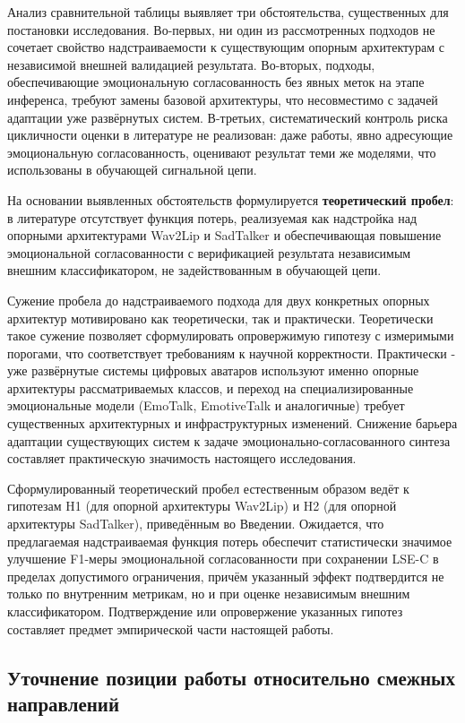 \documentclass[a4paper, 12pt, oneside, openany]{article}
\begin{document}
Анализ сравнительной таблицы выявляет три обстоятельства, существенных для постановки исследования. Во-первых, ни один из рассмотренных подходов не сочетает свойство надстраиваемости к существующим опорным архитектурам с независимой внешней валидацией результата. Во-вторых, подходы, обеспечивающие эмоциональную согласованность без явных меток на этапе инференса, требуют замены базовой архитектуры, что несовместимо с задачей адаптации уже развёрнутых систем. В-третьих, систематический контроль риска цикличности оценки в литературе не реализован: даже работы, явно адресующие эмоциональную согласованность, оценивают результат теми же моделями, что использованы в обучающей сигнальной цепи.

На основании выявленных обстоятельств формулируется \textbf{теоретический пробел}: в литературе отсутствует функция потерь, реализуемая как надстройка над опорными архитектурами Wav2Lip и SadTalker и обеспечивающая повышение эмоциональной согласованности с верификацией результата независимым внешним классификатором, не задействованным в обучающей цепи.

Сужение пробела до надстраиваемого подхода для двух конкретных опорных архитектур мотивировано как теоретически, так и практически. Теоретически такое сужение позволяет сформулировать опровержимую гипотезу с измеримыми порогами, что соответствует требованиям к научной корректности. Практически - уже развёрнутые системы цифровых аватаров используют именно опорные архитектуры рассматриваемых классов, и переход на специализированные эмоциональные модели (EmoTalk, EmotiveTalk и аналогичные) требует существенных архитектурных и инфраструктурных изменений. Снижение барьера адаптации существующих систем к задаче эмоционально-согласованного синтеза составляет практическую значимость настоящего исследования.

Сформулированный теоретический пробел естественным образом ведёт к гипотезам H1 (для опорной архитектуры Wav2Lip) и H2 (для опорной архитектуры SadTalker), приведённым во Введении. Ожидается, что предлагаемая надстраиваемая функция потерь обеспечит статистически значимое улучшение F1-меры эмоциональной согласованности при сохранении LSE-C в пределах допустимого ограничения, причём указанный эффект подтвердится не только по внутренним метрикам, но и при оценке независимым внешним классификатором. Подтверждение или опровержение указанных гипотез составляет предмет эмпирической части настоящей работы.

\subsection{Уточнение позиции работы относительно смежных направлений}
\end{document}
